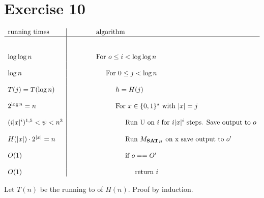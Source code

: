\documentclass[10pt]{article}
\newcommand{\nice}[1]{\textbf{#1}}
\begin{document}
\section*{Exercise 10}
  \begin{math}
    \begin{array}{l | c l}
      \text{running times} & & \text{algorithm} \\ \hline
      & & \\
      & & \\
      \log \log n & & \text{For }o\leq i < \log \log n \\
      & & \\
      \log n      & & \hspace{5mm}\text{For }0\leq j < \log n \\
      & & \\
      T(j)=T(\log n)
                  & & \hspace{10mm} h=H(j) \\
      & & \\
      2^{\log n} = n & & \hspace{10mm}\text{For $x\in\{0,1\}^\star$ with $|x|=j$} \\
      & & \\
      (i|x|^i)^{1,5} < \psi < n^3 & &
                    \text{\hspace{15mm}Run U on $i$ for $i|x|^i$ steps. Save
                    output to $o$} \\
      & & \\
      H(|x|)\cdot 2^{|x|}=n
                & & \text{\hspace{15mm}Run $M_{\nice{SAT}_{H}}$ on x save output to
                $o^\prime$} \\
      & \\
      O(1)   & & \text{\hspace{15mm}if $o==O^\prime$} \\
      & \\
      O(1)      &\hspace{10mm} & \text{\hspace{20mm}return $i$}
    \end{array}
  \end{math}

  Let $T(n)$ be the running to of $H(n)$. Proof by induction.
  
\end{document}
